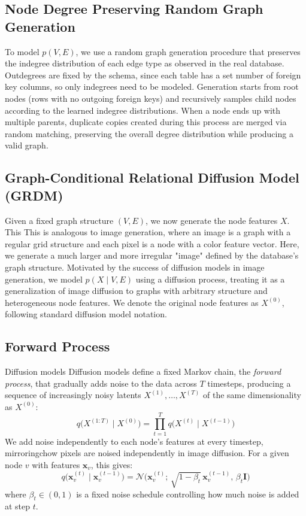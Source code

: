 \documentclass[manuscript,review]{acmart}
\begin{document}
\subsection{Node Degree Preserving Random Graph Generation}
\label{sec:graph-gen}
To model $p(V, E)$, we use a random graph generation procedure that preserves the indegree distribution of each edge type as observed in the real database. Outdegrees are fixed by the schema, since each table has a set number of foreign key columns, so only indegrees need to be modeled. Generation starts from root nodes (rows with no outgoing foreign keys) and recursively samples child nodes according to the learned indegree distributions. When a node ends up with multiple parents, duplicate copies created during this process are merged via random matching, preserving the overall degree distribution while producing a valid graph.

\subsection{Graph-Conditional Relational Diffusion Model (GRDM)}
\label{sec:grdm}
Given a fixed graph structure $(V,E)$, we now generate the node features $X$. This This is analogous to image generation, where an image is a graph with a regular grid structure and each pixel is a node with a color feature vector. Here, we generate a much larger and more irregular "image" defined by the database's graph structure. Motivated by the success of diffusion models in image generation, we model $p(X \mid V, E)$ using a diffusion process, treating it as a generalization of image diffusion to graphs with arbitrary structure and heterogeneous node features. We denote the original node features as $X^{(0)}$, following standard diffusion model notation.

\subsection{Forward Process}
Diffusion models Diffusion models define a fixed Markov chain, the \emph{forward process}, that gradually adds noise to the data across $T$ timesteps, producing a sequence of increasingly noisy latents $X^{(1)}, \dots, X^{(T)}$ of the same dimensionality as $X^{(0)}$:
\begin{equation}
    q\big(X^{(1:T)} \mid X^{(0)}\big) = \prod_{t=1}^{T} q\big(X^{(t)} \mid X^{(t-1)}\big)
    \label{eq:forward-chain}
\end{equation}
We add noise independently to each node's features at every timestep, mirroringchow pixels are noised independently in image diffusion. For a given node $v$ with features $\mathbf{x}_v$, this gives:
\begin{equation}
    q\big(\mathbf{x}_v^{(t)} \mid \mathbf{x}_v^{(t-1)}\big) = \mathcal{N}\!\big(\mathbf{x}_v^{(t)};\, \sqrt{1-\beta_t}\, \mathbf{x}_v^{(t-1)},\, \beta_t \mathbf{I}\big)
    \label{eq:forward-node}
\end{equation}
where $\beta_t \in (0,1)$ is a fixed noise schedule controlling how much noise is added at step $t$.
\end{document}
